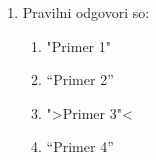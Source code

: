 \documentclass[11pt]{article}
\begin{document}
\begin{enumerate}
      \item Pravilni odgovori so: %
        \begin{enumerate}
          \item "Primer 1"
          \item ``Primer 2''
          \item ">Primer 3"<
          \item "`Primer 4"'
        \end{enumerate}
    
\end{enumerate}
\end{document}
